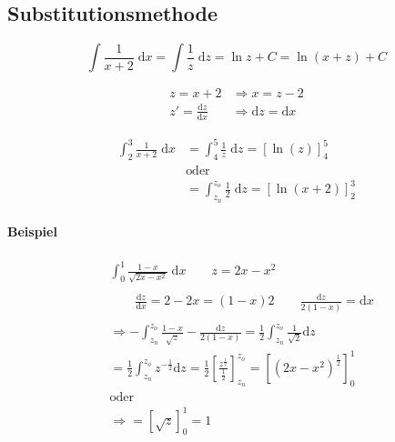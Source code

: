 \subsection{Substitutionsmethode}

\[
    \int \frac{1}{x+2} \;\mathrm{d}x = \int \frac{1}{z} \;\mathrm{d}z = \ln z + C = \ln (x+z) + C
\]

\begin{align*}
    z = x + 2 &\Rightarrow x = z - 2 \\
    z' = \frac{\mathrm{d}z}{\mathrm{d}x} &\Rightarrow \mathrm{d}z = \mathrm{d}x
\end{align*}

\begin{align*}
    \int_2^3 \frac{1}{x+2} \;\mathrm{d}x &= \int_4^5 \frac{1}{z} \;\mathrm{d}z = {[\ln(z)]}_4^5 \\
    &\text{oder} \\
    &= \int_{z_n}^{z_o} \frac{1}{2} \;\mathrm{d}z = {[\ln(x+2)]}_2^3
\end{align*}

\paragraph{Beispiel}

\begin{align*}
    &\int_0^1 \frac{1-x}{\sqrt{2x-x^2}} \;\mathrm{d}x
    \qquad z = 2x - x^2 \\
    \\
    &\qquad \frac{\mathrm{d}z}{\mathrm{d}x} = 2 - 2x = (1-x)2
    \qquad \frac{\mathrm{d}z}{2(1-x)} = \mathrm{d}x \\
    \\
    &\Rightarrow - \int_{z_n}^{z_o} \frac{1-x}{\sqrt{z}} - \frac{\mathrm{d}z}{2(1-x)}
    = \frac{1}{2} \int_{z_n}^{z_o} \frac{1}{\sqrt{2}} \mathrm{d}z \\
    &= \frac{1}{2} \int_{z_n}^{z_o} z^{-\frac{1}{2}} \mathrm{d}z 
    = \frac{1}{2} {\left[ \frac{z^{\frac{1}{2}}}{\frac{1}{2}} \right]}_{z_n}^{z_o}
    = {\left[ {\left( 2x-x^2 \right)}^\frac{1}{2} \right]}_0^1 \\
    &\text{oder} \\
    &\Rightarrow = {\left[ \sqrt{z} \right]}_0^1 = 1
\end{align*}
